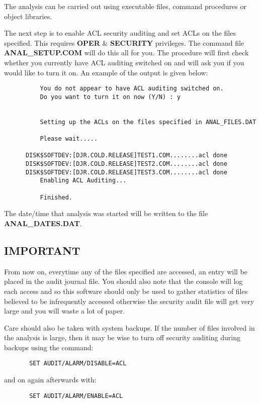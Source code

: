 The analysis can be carried out using executable files, command procedures or
object libraries.

The next step is to enable ACL security auditing and set ACLs on the files
specified. This requires {\bf OPER} \& {\bf SECURITY} privileges. The command
file {\bf ANAL\_SETUP.COM} will do this all for you. The procedure will first
check whether you currently have ACL auditing switched on and will ask you if
you would like to turn it on. An example of the output is given below:

\begin{verbatim}
          You do not appear to have ACL auditing switched on.
          Do you want to turn it on now (Y/N) : y


          Setting up the ACLs on the files specified in ANAL_FILES.DAT

          Please wait.....

      DISK$SOFTDEV:[DJR.COLD.RELEASE]TEST1.COM........acl done
      DISK$SOFTDEV:[DJR.COLD.RELEASE]TEST2.COM........acl done
      DISK$SOFTDEV:[DJR.COLD.RELEASE]TEST3.COM........acl done
          Enabling ACL Auditing...

          Finished.
\end{verbatim}

The date/time that analysis was started will be written to the file {\bf
ANAL\_DATES.DAT}.

\subsection{IMPORTANT}

From now on, everytime any of the files specified are accessed, an entry will
be placed in the audit journal file.  You should also note that the console
will log each access and so this software should only be used to gather
statistics of files believed to be infrequently accessed otherwise the security
audit file will get very large and you will waste a lot of paper.

Care should also be taken with system backups. If the number of files involved
in the analysis is large, then it may be wise to turn off security auditing
during backups using the command:

\begin{verbatim}
       SET AUDIT/ALARM/DISABLE=ACL
\end{verbatim}
and on again afterwards with:
\begin{verbatim}
       SET AUDIT/ALARM/ENABLE=ACL
\end{verbatim}

